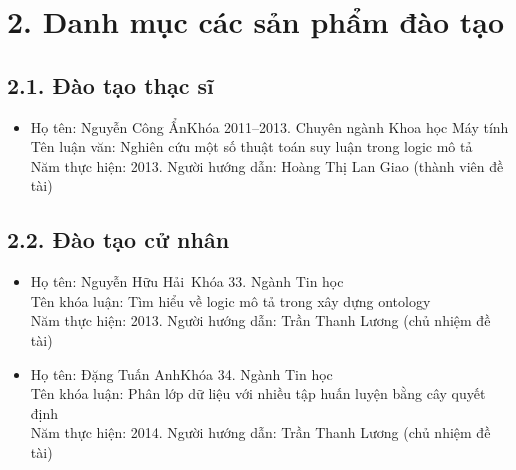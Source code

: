\section*{2. Danh mục các sản phẩm đào tạo}
\vspace{-1.0ex}
\subsection*{2.1. Đào tạo thạc sĩ}
\begin{small}
	\begin{itemize}
		\setlength{\itemsep}{-0.2ex}
		\item Họ tên: Nguyễn Công Ẩn\qquad\;Khóa 2011--2013. Chuyên ngành Khoa học Máy tính\\	
		Tên luận văn: Nghiên cứu một số thuật toán suy luận trong logic mô tả\\	
		Năm thực hiện: 2013. Người hướng dẫn: Hoàng Thị Lan Giao (thành viên đề tài)
	\end{itemize}
\end{small}
\vspace{-2.0ex}
\subsection*{2.2. Đào tạo cử nhân}
\begin{small}
	\begin{itemize}
		\setlength{\itemsep}{-0.2ex}
		\item Họ tên: Nguyễn Hữu Hải\qquad\, Khóa 33. Ngành Tin học\\	
		Tên khóa luận: Tìm hiểu về logic mô tả trong xây dựng ontology\\	
		Năm thực hiện: 2013. Người hướng dẫn: Trần Thanh Lương (chủ nhiệm đề tài)
		
		\item Họ tên: Đặng Tuấn Anh\qquad\;\;\;Khóa 34. Ngành Tin học\\	
		Tên khóa luận: Phân lớp dữ liệu với nhiều tập huấn luyện bằng cây quyết định\\	
		Năm thực hiện: 2014. Người hướng dẫn: Trần Thanh Lương (chủ nhiệm đề tài)
	\end{itemize}
\end{small}